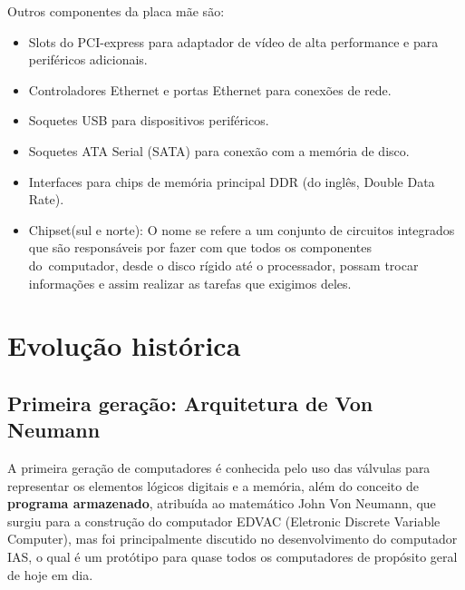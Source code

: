 \documentclass{article}
\begin{document}
Outros componentes da placa mãe são:

\begin{itemize}
    \item Slots do PCI-express para adaptador de vídeo de alta
       performance e para periféricos adicionais.

    \item Controladores Ethernet e portas Ethernet para conexões de rede.
        
    \item Soquetes USB para dispositivos periféricos.

    \item Soquetes ATA Serial (SATA) para conexão com a memória de disco.

    \item Interfaces para chips de memória principal DDR (do inglês, Double
        Data Rate).

    \item Chipset(sul e norte):  O nome se refere a um conjunto de circuitos
        integrados que são responsáveis por fazer com que todos os componentes
        do computador, desde o disco rígido até o processador, possam trocar
        informações e assim realizar as tarefas que exigimos deles.
\end{itemize}

\section{Evolução histórica}
\subsection{Primeira geração: Arquitetura de Von Neumann}
A primeira geração de computadores é conhecida pelo uso das válvulas para
representar os elementos lógicos digitais e a memória, além do
conceito de \textbf{programa armazenado}, atribuída ao matemático John Von
Neumann, que surgiu para a construção do computador EDVAC (Eletronic Discrete
Variable Computer), mas foi principalmente discutido no desenvolvimento do
computador IAS, o qual é um protótipo para quase todos os computadores de
propósito geral de hoje em dia.
\end{document}
